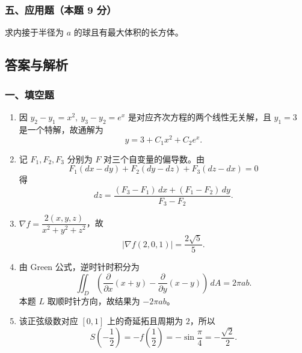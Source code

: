 \subsubsection*{五、应用题（本题 9 分）}
求内接于半径为 $a$ 的球且有最大体积的长方体。

\subsection{答案与解析}

\subsubsection*{一、填空题}
\begin{enumerate}
  \item 因 $y_2-y_1=x^2,\ y_3-y_2=e^x$ 是对应齐次方程的两个线性无关解，且 $y_1=3$ 是一个特解，故通解为
  \[
  y=3+C_1x^2+C_2e^x.
  \]
  \item 记 $F_1,F_2,F_3$ 分别为 $F$ 对三个自变量的偏导数。由
  \[
  F_1(dx-dy)+F_2(dy-dz)+F_3(dz-dx)=0
  \]
  得
  \[
  dz=\frac{(F_3-F_1)\,dx+(F_1-F_2)\,dy}{F_3-F_2}.
  \]
  \item $\nabla f=\dfrac{2(x,y,z)}{x^2+y^2+z^2}$，故
  \[
  |\nabla f(2,0,1)|=\frac{2\sqrt5}{5}.
  \]
  \item 由 Green 公式，逆时针时积分为
  \[
  \iint_D\left(\frac{\partial}{\partial x}(x+y)-\frac{\partial}{\partial y}(x-y)\right)\,dA
  =2\pi ab.
  \]
  本题 $L$ 取顺时针方向，故结果为 $-2\pi ab$。
  \item 该正弦级数对应 $[0,1]$ 上的奇延拓且周期为 $2$，所以
  \[
  S\!\left(-\frac12\right)=-f\!\left(\frac12\right)=-\sin\frac{\pi}{4}=-\frac{\sqrt2}{2}.
  \]
\end{enumerate}


